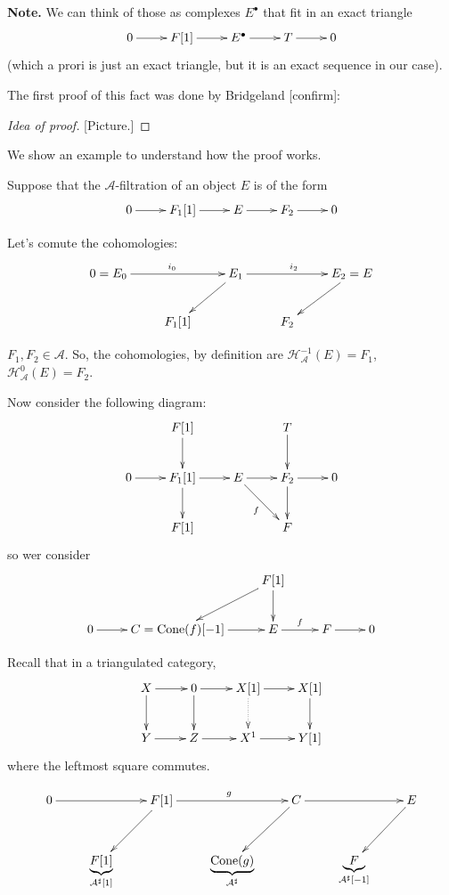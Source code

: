 \noindent
{\bf Note.} We can think of those as
complexes $E ^\bullet$ that fit in an exact triangle
 $$
\xymatrix{
0\ar[r]&F[1]\ar[r]&E^\bullet\ar[r]&T\ar[r]&0
}
$$
(which a prori is just an exact triangle, but it is an exact
sequence in our case).

The first proof of this fact was done by Bridgeland [confirm]:

\begin{proof}[Idea of proof]
[Picture.]
\end{proof}

We show an example to understand how the proof works.

\begin{example}
\label{example-}
Suppose that the $\mathcal{A}$-filtration of an object $E$ is of the form
$$
\xymatrix{
0\ar[r]&F_1[1]\ar[r]&E\ar[r]&F_2\ar[r]&0
}
$$

Let's comute the cohomologies:
$$
\xymatrix{
0=E_0\ar[rr]^{i_0}&&E_1\ar[dl]\ar[rr]^{i_2}&&E_2=E\ar[dl]\\
&F_1[1]&  & F_2
}
$$

$F_1,F_2 \in \mathcal{A}$. So, the cohomologies, by definition are
 $\mathcal{H}_{\mathcal{A}}^{-1}(E)=F_1$,
$\mathcal{H}_{\mathcal{A}}^0(E)=F_2$.
 
Now consider the following diagram:
$$
\xymatrix{
&  F[1]\ar[d]&  &  T\ar[d]\\
0 \ar[r]&  F_1[1]\ar[d]\ar[r]&  E \ar[r]\ar[rd]_f&  F_2\ar[d]\ar[r]& 0\\
& F[1]& & F
}
$$
so wer consider
$$
\xymatrix{
& & F[1]\ar[dl]\ar[d]\\
0\ar[r]&C=\text{Cone}(f)[-1]\ar[r]&E\ar[r]^f&F\ar[r]&0
}
$$
\end{example}

Recall that in a triangulated category,
$$
\xymatrix{
X\ar[d]\ar[r]&  0 \ar[d]\ar[r]& X[1]\ar@{.>}[d]\ar[r]& X[1]\ar[d]\\
Y\ar[r]& Z\ar[r]& X^1\ar[r]&Y[1]
}
$$
where the leftmost square commutes.

$$
\xymatrix{
0\ar[rr]&&F[1]\ar[dl]\ar[rr]^{g}&  &  C \ar[dl]\ar[rr]&  &  E\ar[dl]\\
&  \underbrace{F[1]}_{\mathcal{A}^\sharp[1]}&  &  \underbrace{\text{Cone}(g)}_{\mathcal{A}^\sharp}& &
\underbrace{F}_{\mathcal{A}^\sharp[-1]}
}
$$


